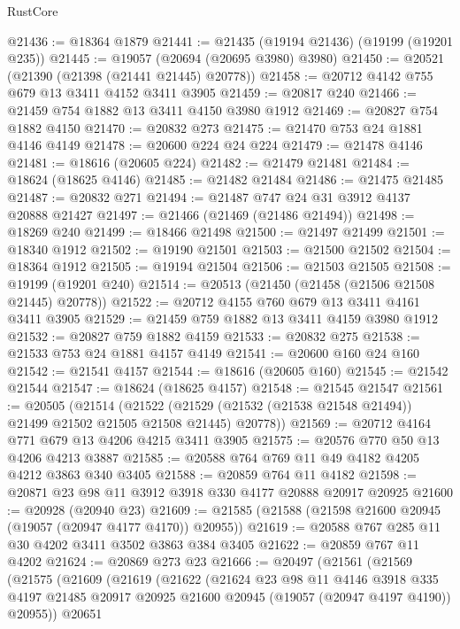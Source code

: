 \begin{lexlean}{RustCore}
\begin{coremodule}
@21436 := @18364 @1879
@21441 := @21435 (@19194 @21436) (@19199 (@19201 @235))
@21445 := @19057 (@20694 (@20695 @3980) @3980)
@21450 := @20521 (@21390 (@21398 (@21441 @21445) @20778))
@21458 := @20712 @4142 @755 @679 @13 @3411 @4152 @3411 @3905
@21459 := @20817 @240
@21466 := @21459 @754 @1882 @13 @3411 @4150 @3980 @1912
@21469 := @20827 @754 @1882 @4150
@21470 := @20832 @273
@21475 := @21470 @753 @24 @1881 @4146 @4149
@21478 := @20600 @224 @24 @224
@21479 := @21478 @4146
@21481 := @18616 (@20605 @224)
@21482 := @21479 @21481
@21484 := @18624 (@18625 @4146)
@21485 := @21482 @21484
@21486 := @21475 @21485
@21487 := @20832 @271
@21494 := @21487 @747 @24 @31 @3912 @4137 @20888 @21427
@21497 := @21466 (@21469 (@21486 @21494))
@21498 := @18269 @240
@21499 := @18466 @21498
@21500 := @21497 @21499
@21501 := @18340 @1912
@21502 := @19190 @21501
@21503 := @21500 @21502
@21504 := @18364 @1912
@21505 := @19194 @21504
@21506 := @21503 @21505
@21508 := @19199 (@19201 @240)
@21514 := @20513 (@21450 (@21458 (@21506 @21508 @21445) @20778))
@21522 := @20712 @4155 @760 @679 @13 @3411 @4161 @3411 @3905
@21529 := @21459 @759 @1882 @13 @3411 @4159 @3980 @1912
@21532 := @20827 @759 @1882 @4159
@21533 := @20832 @275
@21538 := @21533 @753 @24 @1881 @4157 @4149
@21541 := @20600 @160 @24 @160
@21542 := @21541 @4157
@21544 := @18616 (@20605 @160)
@21545 := @21542 @21544
@21547 := @18624 (@18625 @4157)
@21548 := @21545 @21547
@21561 := @20505
    (@21514
      (@21522 (@21529 (@21532 (@21538 @21548 @21494)) @21499 @21502 @21505 @21508 @21445) @20778))
@21569 := @20712 @4164 @771 @679 @13 @4206 @4215 @3411 @3905
@21575 := @20576 @770 @50 @13 @4206 @4213 @3887
@21585 := @20588 @764 @769 @11 @49 @4182 @4205 @4212 @3863 @340 @3405
@21588 := @20859 @764 @11 @4182
@21598 := @20871 @23 @98 @11 @3912 @3918 @330 @4177 @20888 @20917 @20925
@21600 := @20928 (@20940 @23)
@21609 := @21585 (@21588 (@21598 @21600 @20945 (@19057 (@20947 @4177 @4170)) @20955))
@21619 := @20588 @767 @285 @11 @30 @4202 @3411 @3502 @3863 @384 @3405
@21622 := @20859 @767 @11 @4202
@21624 := @20869 @273 @23
@21666 := @20497
    (@21561
      (@21569
        (@21575
          (@21609
            (@21619
              (@21622
                (@21624
                  @23
                  @98
                  @11
                  @4146
                  @3918
                  @335
                  @4197
                  @21485
                  @20917
                  @20925
                  @21600
                  @20945
                  (@19057 (@20947 @4197 @4190))
                  @20955))
              @20651

\end{coremodule}
\end{lexlean}
